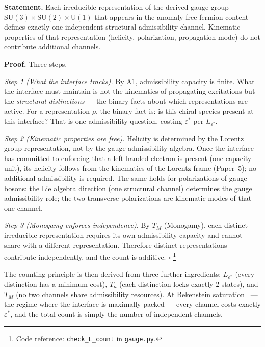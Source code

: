 \documentclass[11pt]{article}
\newcommand{\coderef}[2]{\footnote{Code reference: \texttt{#1} in \texttt{#2}.}}
\newcommand{\SU}{\mathrm{SU}}
\newcommand{\U}{\mathrm{U}}
\begin{document}
\begin{tcolorbox}[apfbox, title={Lemma $L_{\mathrm{species}}$ (Species as Admissibility Channels)}]
\textbf{Statement.}  Each irreducible representation of the derived gauge group $\SU(3) \times \SU(2) \times \U(1)$ that appears in the anomaly-free fermion content defines exactly one independent structural admissibility channel.  Kinematic properties of that representation (helicity, polarization, propagation mode) do not contribute additional channels.

\smallskip\noindent\textbf{Proof.}  Three steps.

\textit{Step 1 (What the interface tracks).}  By A1, admissibility capacity is finite.  What the interface must maintain is not the kinematics of propagating excitations but the \emph{structural distinctions} --- the binary facts about which representations are active.  For a representation $\rho$, the binary fact is: is this chiral species present at this interface?  That is one admissibility question, costing $\varepsilon^*$ per $L_{\varepsilon^*}$.

\textit{Step 2 (Kinematic properties are free).}  Helicity is determined by the Lorentz group representation, not by the gauge admissibility algebra.  Once the interface has committed to enforcing that a left-handed electron is present (one capacity unit), its helicity follows from the kinematics of the Lorentz frame (Paper~5); no additional admissibility is required.  The same holds for polarizations of gauge bosons: the Lie algebra direction (one structural channel) determines the gauge admissibility role; the two transverse polarizations are kinematic modes of that one channel.

\textit{Step 3 (Monogamy enforces independence).}  By $T_M$ (Monogamy), each distinct irreducible representation requires its own admissibility capacity and cannot share with a different representation.  Therefore distinct representations contribute independently, and the count is additive.  $\square$
\coderef{check\_L\_count}{gauge.py}
\end{tcolorbox}

The counting principle is then derived from three further ingredients: $L_{\varepsilon^*}$ (every distinction has a minimum cost), $T_\kappa$ (each distinction locks exactly 2 states), and $T_M$ (no two channels share admissibility resources).  At Bekenstein saturation~\cite{Bekenstein1973} --- the regime where the interface is maximally packed --- every channel costs exactly $\varepsilon^*$, and the total count is simply the number of independent channels.
\end{document}
